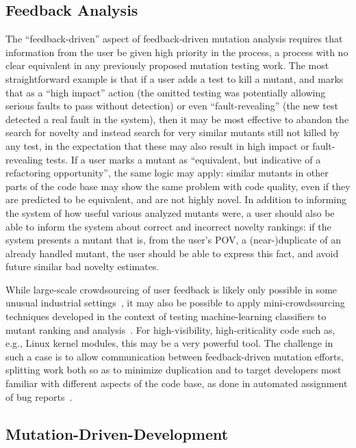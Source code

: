 \subsection{Feedback Analysis}
\label{sec:feedbackplan}

The ``feedback-driven'' aspect of feedback-driven mutation analysis
requires that information from the user be given high priority in the
process, a process with no clear equivalent in any previously proposed
mutation testing work.  The most straightforward example is that if a
user adds a test to kill a mutant, and marks that as a ``high impact''
action (the omitted testing was potentially allowing serious faults to
pass without detection) or even ``fault-revealing'' (the new test
detected a real fault in the system), then it may be most effective to
abandon the search for novelty and instead search for very similar
mutants still not killed by any test, in the expectation that these
may also result in high impact or fault-revealing tests.  If a user
marks a mutant as ``equivalent, but indicative of a refactoring
opportunity'', the same logic may apply:  similar mutants in other
parts of the code base may show the same problem with code quality,
even if they are predicted to be equivalent, and are not highly
novel.  In addition to informing the system of how useful various
analyzed mutants were, a user should also be able to inform the system
about correct and incorrect novelty rankings:  if the system presents
a mutant that is, from the user's POV, a (near-)duplicate of an
already handled mutant, the user should be able to express this fact,
and avoid future similar bad novelty estimates.

While large-scale crowdsourcing of user feedback is likely only
possible in some unusual industrial
settings~\cite{MutGoogle,ivankovic2018industrial}, it may also be
possible to apply mini-crowdsourcing techniques developed in the
context of testing machine-learning classifiers to mutant ranking and
analysis~\cite{Minicrowd}.  For high-visibility, high-criticality code
such as, e.g., Linux kernel modules, this may be a very powerful
tool.  The challenge in such a case is to allow communication between
feedback-driven mutation efforts, splitting work both so as to
minimize duplication and to target developers most familiar with
different aspects of the code base, as done in automated assignment of
bug reports~\cite{bhattacharya2012automated,jonsson2016automated}.


\subsection{Mutation-Driven-Development}

